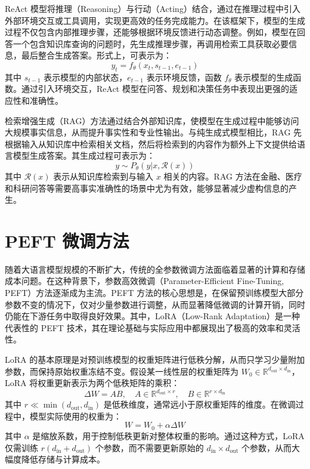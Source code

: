 \documentclass[professional,privacy,print,win,long,STEM,AutoFakeBold]{def/buaa}
\begin{document}
ReAct 模型将推理（Reasoning）与行动（Acting）结合，通过在推理过程中引入外部环境交互或工具调用，实现更高效的任务完成能力。在该框架下，模型的生成过程不仅包含内部推理步骤，还能够根据环境反馈进行动态调整。例如，模型在回答一个包含知识库查询的问题时，先生成推理步骤，再调用检索工具获取必要信息，最后整合生成答案。形式上，可表示为：
\begin{equation}
y_t = f_\theta(x_t, s_{t-1}, e_{t-1})
\end{equation}
其中 \(s_{t-1}\) 表示模型的内部状态，\(e_{t-1}\) 表示环境反馈，函数 \(f_\theta\) 表示模型的生成函数。通过引入环境交互，ReAct 模型在问答、规划和决策任务中表现出更强的适应性和准确性。

检索增强生成（RAG）方法通过结合外部知识库，使模型在生成过程中能够访问大规模事实信息，从而提升事实性和专业性输出。与纯生成式模型相比，RAG 先根据输入从知识库中检索相关文档，然后将检索到的内容作为额外上下文提供给语言模型生成答案。其生成过程可表示为：
\begin{equation}
y \sim P_\theta(y|x, \mathcal{R}(x))
\end{equation}
其中 \(\mathcal{R}(x)\) 表示从知识库检索到与输入 \(x\) 相关的内容。RAG 方法在金融、医疗和科研问答等需要高事实准确性的场景中尤为有效，能够显著减少虚构信息的产生。

\section{PEFT 微调方法}

随着大语言模型规模的不断扩大，传统的全参数微调方法面临着显著的计算和存储成本问题。在这种背景下，参数高效微调（Parameter-Efficient Fine-Tuning, PEFT）方法逐渐成为主流。PEFT 方法的核心思想是，在保留预训练模型大部分参数不变的情况下，仅对少量参数进行调整，从而显著降低微调的计算开销，同时仍能在下游任务中取得良好效果。其中，LoRA（Low-Rank Adaptation）是一种代表性的 PEFT 技术，其在理论基础与实际应用中都展现出了极高的效率和灵活性。

LoRA 的基本原理是对预训练模型的权重矩阵进行低秩分解，从而只学习少量附加参数，而保持原始权重冻结不变。假设某一线性层的权重矩阵为 \(W_0 \in \mathbb{R}^{d_\text{out} \times d_\text{in}}\)，LoRA 将权重更新表示为两个低秩矩阵的乘积：
\begin{equation}
\Delta W = A B, \quad A \in \mathbb{R}^{d_\text{out} \times r}, \quad B \in \mathbb{R}^{r \times d_\text{in}}
\end{equation}
其中 \(r \ll \min(d_\text{out}, d_\text{in})\) 是低秩维度，通常远小于原权重矩阵的维度。在微调过程中，模型实际使用的权重为：
\begin{equation}
W = W_0 + \alpha \Delta W
\end{equation}
其中 \(\alpha\) 是缩放系数，用于控制低秩更新对整体权重的影响。通过这种方式，LoRA 仅需训练 \(r(d_\text{in} + d_\text{out})\) 个参数，而不需要更新原始的 \(d_\text{in} \times d_\text{out}\) 个参数，从而大幅度降低存储与计算成本。
\end{document}
